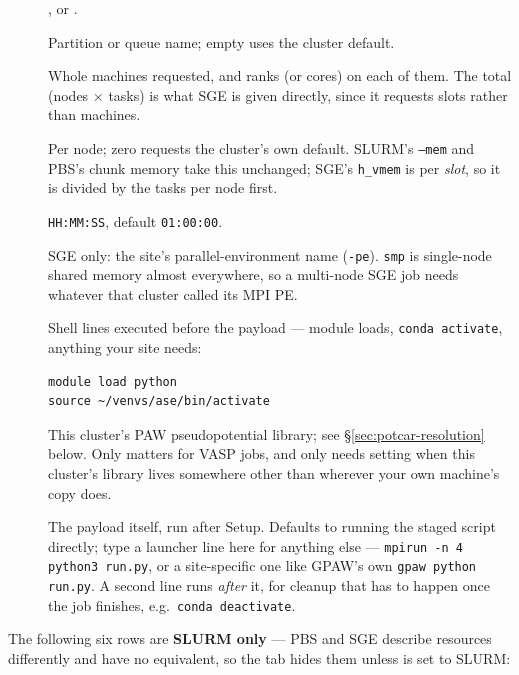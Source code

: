\begin{description}
  \item[] ,  or .
  \item[] Partition or queue name; empty uses the cluster default.
  \item[] Whole machines requested, and ranks (or
    cores) on each of them. The total (nodes $\times$ tasks) is what SGE is
    given directly, since it requests slots rather than machines.
  \item[] Per node; zero requests the cluster's own
    default. SLURM's \texttt{--mem} and PBS's chunk memory take this
    unchanged; SGE's \texttt{h\_vmem} is per \emph{slot}, so it is divided
    by the tasks per node first.
  \item[] \texttt{HH:MM:SS}, default \texttt{01:00:00}.
  \item[] SGE only: the site's parallel-environment name
    (\texttt{-pe}). \texttt{smp} is single-node shared memory almost
    everywhere, so a multi-node SGE job needs whatever that cluster called
    its MPI PE.
  \item[] Shell lines executed before the payload --- module
    loads, \texttt{conda activate}, anything your site needs:
    \begin{lstlisting}
module load python
source ~/venvs/ase/bin/activate
    \end{lstlisting}
  \item[] This cluster's PAW pseudopotential library;
    see \S\ref{sec:potcar-resolution} below. Only matters for VASP jobs,
    and only needs setting when this cluster's library lives somewhere
    other than wherever your own machine's copy does.
  \item[] The payload itself, run after Setup. Defaults to
    running the staged script directly; type a launcher line here for
    anything else --- \texttt{mpirun -n 4 python3 run.py}, or a
    site-specific one like GPAW's own \texttt{gpaw python run.py}. A second
    line runs \emph{after} it, for cleanup that has to happen once the job
    finishes, e.g.\ \texttt{conda deactivate}.
\end{description}

The following six rows are \textbf{SLURM only} --- PBS and SGE describe
resources differently and have no equivalent, so the  tab
hides them unless  is set to SLURM:

